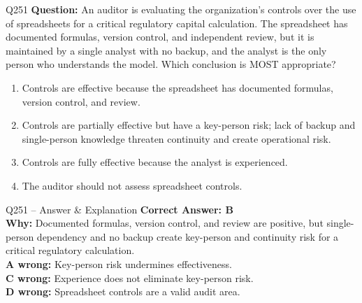 \documentclass[aspectratio=169,10pt]{beamer}
\begin{document}
	\begin{frame}[t]{Q251}
		\small
		\textbf{Question:} An auditor is evaluating the organization's controls over the use of spreadsheets for a critical regulatory capital calculation. The spreadsheet has documented formulas, version control, and independent review, but it is maintained by a single analyst with no backup, and the analyst is the only person who understands the model. Which conclusion is MOST appropriate?
		\begin{enumerate}[label=\Alph*.,itemsep=1pt,topsep=2pt]
			\item Controls are effective because the spreadsheet has documented formulas, version control, and review.
			\item Controls are partially effective but have a key-person risk; lack of backup and single-person knowledge threaten continuity and create operational risk.
			\item Controls are fully effective because the analyst is experienced.
			\item The auditor should not assess spreadsheet controls.
		\end{enumerate}
	\end{frame}
	
	\begin{frame}[t]{Q251 -- Answer \& Explanation}
		\small
		\textbf{Correct Answer: B} \\[4pt]
		\textbf{Why:} Documented formulas, version control, and review are positive, but single-person dependency and no backup create key-person and continuity risk for a critical regulatory calculation. \\[4pt]
		\textbf{A wrong:} Key-person risk undermines effectiveness. \\[2pt]
		\textbf{C wrong:} Experience does not eliminate key-person risk. \\[2pt]
		\textbf{D wrong:} Spreadsheet controls are a valid audit area.
	\end{frame}
	
\end{document}
